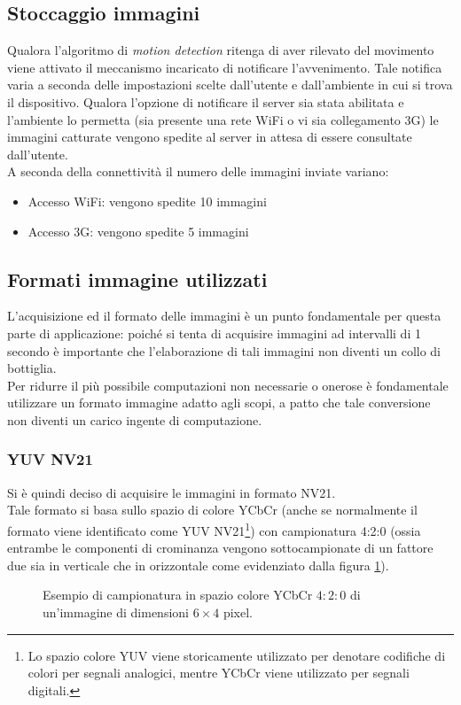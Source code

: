 \subsection{Stoccaggio immagini}
Qualora l'algoritmo di \textit{motion detection} ritenga di aver rilevato del movimento viene attivato il meccanismo incaricato di notificare l'avvenimento. Tale notifica varia a seconda delle impostazioni scelte dall'utente e dall'ambiente in cui si trova il dispositivo. Qualora l'opzione di notificare il server sia stata abilitata e l'ambiente lo permetta (sia presente una rete WiFi o vi sia collegamento 3G) le immagini catturate vengono spedite al server in attesa di essere consultate dall'utente.\\
A seconda della connettività il numero delle immagini inviate variano:
\begin{itemize}
  \item Accesso WiFi: vengono spedite 10 immagini
  \item Accesso 3G: vengono spedite 5 immagini
\end{itemize}

\subsection{Formati immagine utilizzati}
L'acquisizione ed il formato delle immagini è un punto fondamentale per questa parte di applicazione: poiché si tenta di acquisire immagini ad intervalli di 1 secondo è importante che l'elaborazione di tali immagini non diventi un collo di bottiglia.\\

Per ridurre il più possibile computazioni non necessarie o onerose è fondamentale utilizzare un formato immagine adatto agli scopi, a patto che tale conversione non diventi un carico ingente di computazione.\\

\subsubsection{YUV NV21}
Si è quindi deciso di acquisire le immagini in formato NV21.\\
Tale formato si basa sullo spazio di colore YCbCr (anche se normalmente il formato viene identificato come YUV NV21\footnote{ Lo spazio colore YUV viene storicamente utilizzato per denotare codifiche di colori per segnali analogici, mentre YCbCr viene utilizzato per segnali digitali.}) con campionatura 4:2:0 (ossia entrambe le componenti di crominanza vengono sottocampionate di un fattore due sia in verticale che in orizzontale come evidenziato dalla figura \ref{YUVsampling}).\\
\begin{figure}[!ht]
\begin{center}
\YUVsampling
\end{center}
\caption{Esempio di campionatura in spazio colore YCbCr $4:2:0$ di un'immagine di dimensioni $6×4$ pixel.}
\label{YUVsampling}
\end{figure}

